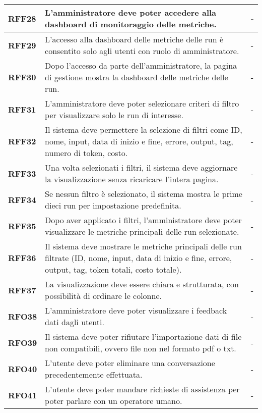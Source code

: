 \begin{longtable}{|>{\centering\arraybackslash}m{}|>{\centering\arraybackslash}m{}|>{\centering\arraybackslash}m{}|}
    \hline
    \textbf{RFF28} & L'amministratore deve poter accedere alla dashboard di monitoraggio delle metriche. & - \\
    \hline
    \textbf{RFF29} & L’accesso alla dashboard delle metriche delle run è consentito solo agli utenti con ruolo di amministratore. & - \\
    \hline
    \textbf{RFF30} & Dopo l’accesso da parte dell'amministratore, la pagina di gestione mostra la dashboard delle metriche delle run. & - \\
    \hline
    \textbf{RFF31} & L’amministratore deve poter selezionare criteri di filtro per visualizzare solo le run di interesse. & - \\
    \hline
    \textbf{RFF32} & Il sistema deve permettere la selezione di filtri come ID, nome, input, data di inizio e fine, errore, output, tag, numero di token, costo. & - \\
    \hline
    \textbf{RFF33} & Una volta selezionati i filtri, il sistema deve aggiornare la visualizzazione senza ricaricare l'intera pagina. & - \\
    \hline
    \textbf{RFF34} & Se nessun filtro è selezionato, il sistema mostra le prime dieci run per impostazione predefinita. & - \\
    \hline
    \textbf{RFF35} & Dopo aver applicato i filtri, l’amministratore deve poter visualizzare le metriche principali delle run selezionate. & - \\
    \hline
    \textbf{RFF36} & Il sistema deve mostrare le metriche principali delle run filtrate (ID, nome, input, data di inizio e fine, errore, output, tag, token totali, costo totale). & - \\
    \hline
    \textbf{RFF37} & La visualizzazione deve essere chiara e strutturata, con possibilità di ordinare le colonne. & - \\
    \hline
    \textbf{RFO38} & L'amministratore deve poter visualizzare i feedback dati dagli utenti. & - \\
    \hline
    \textbf{RFO39} & Il sistema deve poter rifiutare l'importazione dati di file non compatibili, ovvero file non nel formato pdf o txt. & - \\
    \hline
    \textbf{RFO40} & L'utente deve poter eliminare una conversazione precedentemente effettuata. & - \\
    \hline
    \textbf{RFO41} & L'utente deve poter mandare richieste di assistenza per poter parlare con un operatore umano. & - \\
    \hline

\end{longtable}
